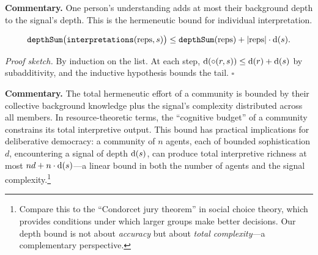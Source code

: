 \noindent\textbf{Commentary.}
One person's understanding adds at most their background depth to the
signal's depth.  This is the hermeneutic bound for individual interpretation.

\begin{theorem}
\label{thm:interpretation_depth_sum_bound}
\[
  \texttt{depthSum}\bigl(\texttt{interpretations}(\text{reps}, s)\bigr)
  \leq \texttt{depthSum}(\text{reps}) + |\text{reps}| \cdot \operatorname{d}(s).
\]
\end{theorem}

\noindent\textit{Proof sketch.}\quad
By induction on the list.  At each step, $\operatorname{d}(\circ(r, s)) \leq
\operatorname{d}(r) + \operatorname{d}(s)$ by subadditivity, and the inductive hypothesis
bounds the tail.
\hfill$\square$

\medskip

\noindent\textbf{Commentary.}
The total hermeneutic effort of a community is bounded by their collective
background knowledge plus the signal's complexity distributed across all
members.  In resource-theoretic terms, the ``cognitive budget'' of a
community constrains its total interpretive output.  This bound has
practical implications for deliberative democracy: a community of $n$
agents, each of bounded sophistication $d$, encountering a signal of
depth $\operatorname{d}(s)$, can produce total interpretive richness at most
$nd + n \cdot \operatorname{d}(s)$---a linear bound in both the number of agents
and the signal complexity.\footnote{Compare this to the ``Condorcet jury
theorem'' in social choice theory, which provides conditions under which
larger groups make better decisions.  Our depth bound is not about
\emph{accuracy} but about \emph{total complexity}---a complementary
perspective.}

